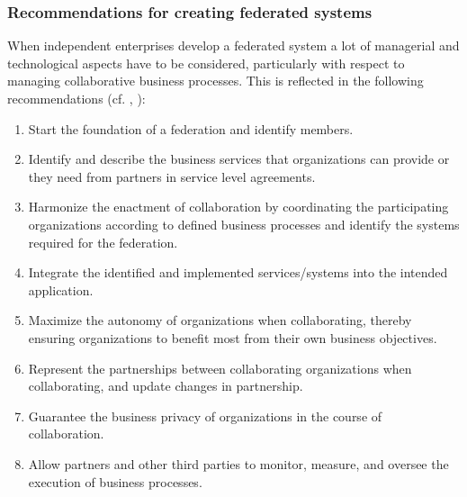 \subsubsection{\textbf{Recommendations for creating federated systems}}
When independent enterprises develop a federated system a lot of managerial and technological aspects have to be considered, particularly with respect to managing collaborative business processes. This is reflected in the following recommendations (cf. \cite{book:PMThirdWave} , \cite{ChallengesDistPM} ):
\begin{enumerate}
	\item Start the foundation of a federation and identify members.
	\item Identify and describe the business services that organizations can provide or they need from partners in service level agreements.
	\item Harmonize the enactment of collaboration by coordinating the participating organizations according to defined business processes and identify the systems required for the federation.
	\item Integrate the identified and implemented services/systems into the intended application. 
	\item Maximize the autonomy of organizations when collaborating, thereby ensuring organizations to benefit most from their own business objectives.
	\item Represent the partnerships between collaborating organizations when collaborating, and update changes in partnership.
	\item Guarantee the business privacy of organizations in the course of collaboration.
	\item Allow partners and other third parties to monitor, measure, and oversee the execution of business processes.
\end{enumerate}


